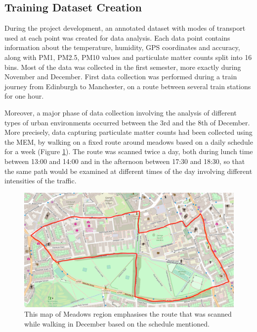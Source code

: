 \documentclass[bsc,frontabs,twoside,singlespacing,parskip,deptreport]{infthesis}     %
\begin{document}
\subsection{Training Dataset Creation}
\label{subsec:training-dataset}

During the project development, an annotated dataset with modes of transport used at each point was created for data analysis. Each data point contains information about the temperature, humidity, GPS coordinates and accuracy, along with PM1, PM2.5, PM10 values and particulate matter counts split into 16 bins. Most of the data was collected in the first semester, more exactly during November and December. First data collection was performed during a train journey from Edinburgh to Manchester, on a route between several train stations for one hour.

Moreover, a major phase of data collection involving the analysis of different types of urban environments occurred between the 3rd and the 8th of December. More precisely, data capturing particulate matter counts had been collected using the MEM, by walking on a fixed route around meadows based on a daily schedule for a week (Figure \ref{fig:december_route}). The route was scanned twice a day, both during lunch time between 13:00 and 14:00 and in the afternoon between 17:30 and 18:30, so that the same path would be examined at different times of the day involving different intensities of the traffic.

\begin{figure}[h]
  \center
  \includegraphics[width=\columnwidth]{december_route.png} 
  \caption{This map of Meadows region emphasises the route that was scanned while walking in December based on the schedule mentioned.}
  \label{fig:december_route}
\end{figure}
\end{document}
